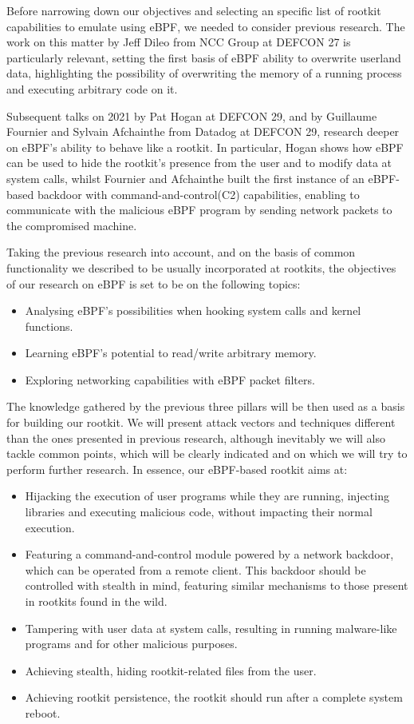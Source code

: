 \documentclass[12pt]{report} %
\begin{document}
Before narrowing down our objectives and selecting an specific list of rootkit capabilities to emulate using eBPF, we needed to consider previous research. The work on this matter by Jeff Dileo from NCC Group at DEFCON 27\cite{evil_ebpf} is particularly relevant, setting the first basis of eBPF ability to overwrite userland data, highlighting the possibility of overwriting the memory of a running process and executing arbitrary code on it.

Subsequent talks on 2021 by Pat Hogan at DEFCON 29\cite{bad_ebpf}, and by Guillaume Fournier and Sylvain Afchainthe from Datadog at DEFCON 29\cite{ebpf_friends}, research deeper on eBPF's ability to behave like a rootkit. In particular, Hogan shows how eBPF can be used to hide the rootkit's presence from the user and to modify data at system calls, whilst Fournier and Afchainthe built the first instance of an eBPF-based backdoor with command-and-control(C2) capabilities, enabling to communicate with the malicious eBPF program by sending network packets to the compromised machine.

Taking the previous research into account, and on the basis of common functionality we described to be usually incorporated at rootkits, the objectives of our research on eBPF is set to be on the following topics:
\begin{itemize}
\item Analysing eBPF's possibilities when hooking system calls and kernel functions.
\item Learning eBPF's potential to read/write arbitrary memory.
\item Exploring networking capabilities with eBPF packet filters.
\end{itemize}

The knowledge gathered by the previous three pillars will be then used as a basis for building our rootkit. We will present attack vectors and techniques different than the ones presented in previous research, although inevitably we will also tackle common points, which will be clearly indicated and on which we will try to perform further research. In essence, our eBPF-based rootkit aims at:
\begin{itemize}
\item Hijacking the execution of user programs while they are running, injecting libraries and executing malicious code, without impacting their normal execution.
\item Featuring a command-and-control module powered by a network backdoor, which can be operated from a remote client. This backdoor should be controlled with stealth in mind, featuring similar mechanisms to those present in rootkits found in the wild.
\item Tampering with user data at system calls, resulting in running malware-like programs and for other malicious purposes.
\item Achieving stealth, hiding rootkit-related files from the user.
\item Achieving rootkit persistence, the rootkit should run after a complete system reboot.
\
\end{itemize}
\end{document}
